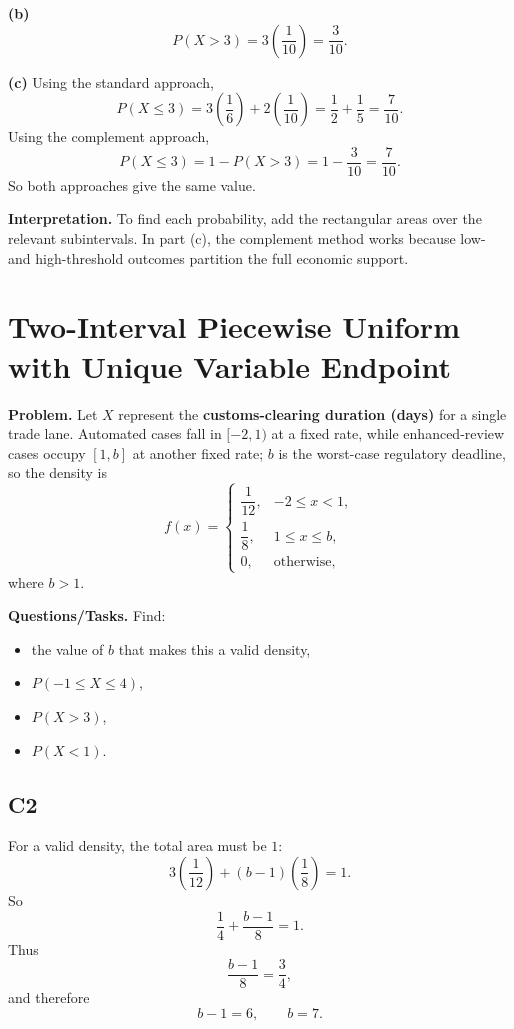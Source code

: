 \textbf{(b)}
\[
P(X>3)=3\left(\frac{1}{10}\right)=\frac{3}{10}.
\]


\textbf{(c)} Using the standard approach,
\[
P(X\le 3)=3\left(\frac{1}{6}\right)+2\left(\frac{1}{10}\right)=\frac{1}{2}+\frac{1}{5}=\frac{7}{10}.
\]
Using the complement approach,
\[
P(X\le 3)=1-P(X>3)=1-\frac{3}{10}=\frac{7}{10}.
\]
So both approaches give the same value.


\textbf{Interpretation.}
To find each probability, add the rectangular areas over the relevant subintervals. In part (c), the complement method works because low- and high-threshold outcomes partition the full economic support.

\section{Two-Interval Piecewise Uniform with Unique Variable Endpoint}

\textbf{Problem.}
Let $X$ represent the \textbf{customs-clearing duration (days)} for a single trade lane. Automated cases fall in $[-2,1)$ at a fixed rate, while enhanced-review cases occupy $[1,b]$ at another fixed rate; $b$ is the worst-case regulatory deadline, so the density is
\[
f(x)=
\begin{cases}
	\dfrac{1}{12}, & -2\le x<1,\\[4pt]
	\dfrac{1}{8}, & 1\le x\le b,\\[4pt]
	0, & \text{otherwise,}
\end{cases}
\]
where $b>1$.

\textbf{Questions/Tasks.}
Find:
\begin{itemize}
	\item[(a)] the value of $b$ that makes this a valid density,
	\item[(b)] $P(-1\le X\le 4)$,
	\item[(c)] $P(X>3)$,
	\item[(d)] $P(X<1)$.
\end{itemize}

\subsection*{C2}
For a valid density, the total area must be $1$:
\[
3\left(\frac{1}{12}\right)+(b-1)\left(\frac{1}{8}\right)=1.
\]
So
\[
\frac{1}{4}+\frac{b-1}{8}=1.
\]
Thus
\[
\frac{b-1}{8}=\frac{3}{4},
\]
and therefore
\[
b-1=6,
\qquad
b=7.
\]

